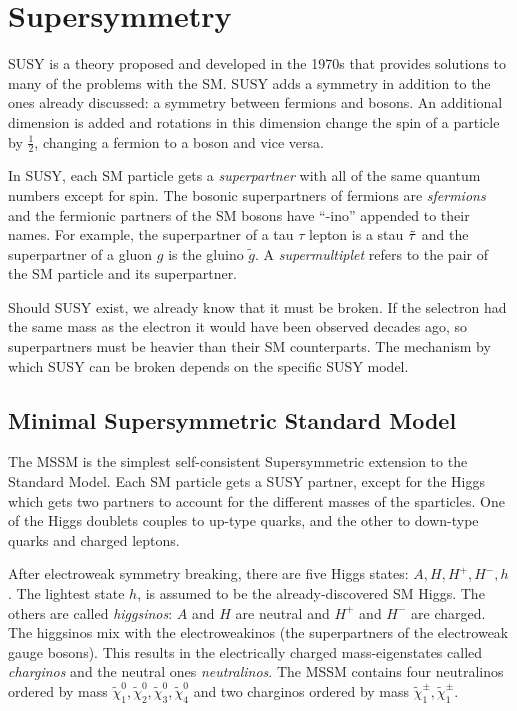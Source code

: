 \section{Supersymmetry}

\acf{SUSY} is a theory proposed and developed in the 1970s \cite{susy-found-1,susy-found-2,susy-found-3} that provides solutions to many of the problems with the \ac{SM}. \ac{SUSY} adds a symmetry in addition to the ones already discussed: a symmetry between fermions and bosons. An additional dimension is added and rotations in this dimension change the spin of a particle by $\frac{1}{2}$, changing a fermion to a boson and vice versa. 

In \ac{SUSY}, each \ac{SM} particle gets a \emph{superpartner} with all of the same quantum numbers except for spin. The bosonic superpartners of fermions are \emph{sfermions} and the fermionic partners of the \ac{SM} bosons have ``-ino'' appended to their names. For example, the superpartner of a tau $\tau$ lepton is a stau $\tilde{\tau}$ and the superpartner of a gluon $g$ is the gluino $\tilde{g}$. A \emph{supermultiplet} refers to the pair of the \ac{SM} particle and its superpartner.

Should \ac{SUSY} exist, we already know that it must be broken. If the selectron had the same mass as the electron it would have been observed decades ago, so superpartners must be heavier than their \ac{SM} counterparts. The mechanism by which \ac{SUSY} can be broken depends on the specific \ac{SUSY} model.

\subsection{Minimal Supersymmetric Standard Model}

The \acf{MSSM} is the simplest self-consistent Supersymmetric extension to the Standard Model. Each \ac{SM} particle gets a \ac{SUSY} partner, except for the Higgs which gets two partners to account for the different masses of the sparticles. One of the Higgs doublets couples to up-type quarks, and the other to down-type quarks and charged leptons. 

After electroweak symmetry breaking, there are five Higgs states: $A, H, H^{+}, H^{-}, h$. The lightest state $h$, is assumed to be the already-discovered \ac{SM} Higgs. The others are called \emph{higgsinos}: $A$ and $H$ are neutral and $H^{+}$ and $H^{-}$ are charged. The higgsinos mix with the electroweakinos (the superpartners of the electroweak gauge bosons). This results in the electrically charged mass-eigenstates called \emph{charginos} and the neutral ones \emph{neutralinos}. The \ac{MSSM} contains four neutralinos ordered by mass $\tilde{\chi}^{0}_{1}, \tilde{\chi}^{0}_{2}, \tilde{\chi}^{0}_{3}, \tilde{\chi}^{0}_{4}$ and two charginos ordered by mass $\tilde{\chi}^{\pm}_{1}, \tilde{\chi}^{\pm}_{1}$. 

